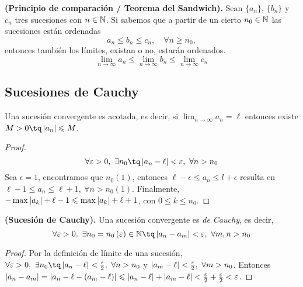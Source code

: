 {\begin{theorem}
    \textbf{(Principio de comparación / Teorema del Sandwich).} Sean $\{a_n\} $, $\{b_n\} $ y $c_n$ tres sucesiones con $n\in\mathbb{N}$. Si sabemos que a partir de un cierto $n_0\in\mathbb{N}$ las sucesiones están ordenadas
    \begin{equation}
        a_n\leq b_n\leq c_n,\quad\forall n\geq n_0,
    \end{equation}
    entonces también los límites, existan o no, estarán ordenados.
    \begin{equation}
        \lim_{n\to\infty}a_n \leq \lim_{n\to\infty} b_n \leq \lim_{n\to\infty} c_n
    \end{equation}
\end{theorem}

\subsection{Sucesiones de Cauchy}
\begin{lemma}
    Una sucesión convergente es acotada, es decir, si $\lim_{n\to\infty} a_n = \ell$ entonces existe $M > 0 \tq \abs{a_n} \leq M$.
\end{lemma}

\begin{proof}
    \begin{equation}
        \forall\epsilon > 0,\ \exists n_0\tq \abs{a_n - \ell} < \epsilon,\ \forall n > n_0
    \end{equation}
    Sea $\epsilon = 1$, encontramos que $n_0\left( 1 \right)$, entonces $\ell - \epsilon \leq a_n\leq l + \epsilon$ resulta en $\ell - 1 \leq a_n \leq \ell + 1,\ \forall n > n_0\left( 1 \right) $. Finalmente, $-\max\left\vert a_k \right\vert+ \ell - 1\leqslant \max\left\vert a_k \right\vert + \ell + 1$, con $0\leq k\leq n_0$.
\end{proof}

\begin{lemma}
    \textbf{(Sucesión de Cauchy).} Una sucesión convergente es \textit{de Cauchy}, es decir,
    \begin{equation}
        \forall\epsilon > 0,\ \exists n_0 = n_0\left( \epsilon \right) \in\N\tq \abs{a_n - a_m} < \epsilon,\ \forall m, n > n_0
    \end{equation}
\end{lemma}

\begin{proof}
    Por la definición de límite de una sucesión, $\forall\epsilon > 0,\ \exists n_0 \tq \abs{a_n - \ell} < \frac{\epsilon}{2},\ \forall n > n_0$ y $\left\vert a_m - \ell \right\vert < \frac{\varepsilon}{2},\ \forall m > n_0$.
    Entonces $\left\vert a_n - a_m \right\vert = \left\vert a_n - \ell - \left( a_m - \ell \right)  \right\vert\leqslant \left\vert a_n - \ell \right\vert + \left\vert a_m - \ell \right\vert < \frac{\varepsilon}{2} + \frac{\varepsilon}{2} < \varepsilon$.
\end{proof}

}
